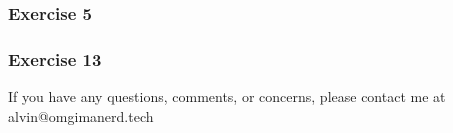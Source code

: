\documentclass{math}
\begin{document}
\subsubsection*{Exercise 5}

\subsubsection*{Exercise 13}

\begin{center}
  If you have any questions, comments, or concerns, please contact me at
  alvin@omgimanerd.tech
\end{center}
\end{document}
